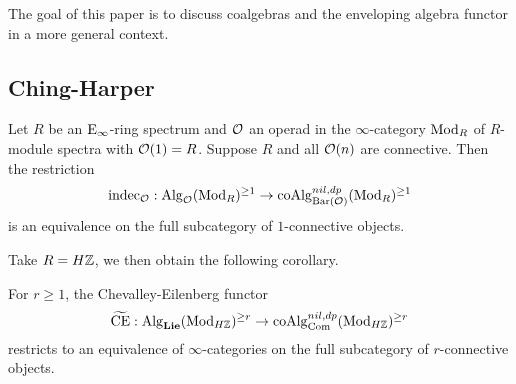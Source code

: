 The goal of this paper is to discuss coalgebras and the enveloping algebra functor in a more general context. 





\subsection{Ching-Harper}
\begin{theorem}
\cite{Ching-Harper}
\label{Ching-Harper's Koszul duality}
	Let $R$ be an $\operatorname{E}_{\infty}$-ring spectrum and ${\mathcal{O}}$ an operad in the $\infty$-category $\operatorname{Mod}_R$ of $R$-module spectra with ${\mathcal{O}}(1)=R$. Suppose $R$ and all ${\mathcal{O}}(n)$ are connective. Then the restriction 
	\[
	\operatorname{indec}_{{\mathcal{O}}}: \operatorname{Alg}_{{\mathcal{O}}}(\operatorname{Mod}_R)^{\geq 1} \to \operatorname{coAlg}^{nil, dp}_{\operatorname{Bar}({\mathcal{O}})}(\operatorname{Mod}_R)^{\geq 1}
	\]
	 is an equivalence on the full subcategory of $1$-connective objects.
\end{theorem}

Take $R=H{\mathbb{Z}}$, we then obtain the following corollary.
\begin{corollary}
	For $r\geq 1$, the Chevalley-Eilenberg functor 
	\[
	\widetilde{\operatorname{CE}}: \operatorname{Alg}_{\mathbf{Lie}}(\operatorname{Mod}_{H{\mathbb{Z}}})^{\geq r} \to \operatorname{coAlg}^{nil, dp}_{\operatorname{Com}}(\operatorname{Mod}_{H{\mathbb{Z}}})^{\geq r}
	\]
	restricts to an equivalence of $\infty$-categories on the full subcategory of $r$-connective objects.
\end{corollary}


